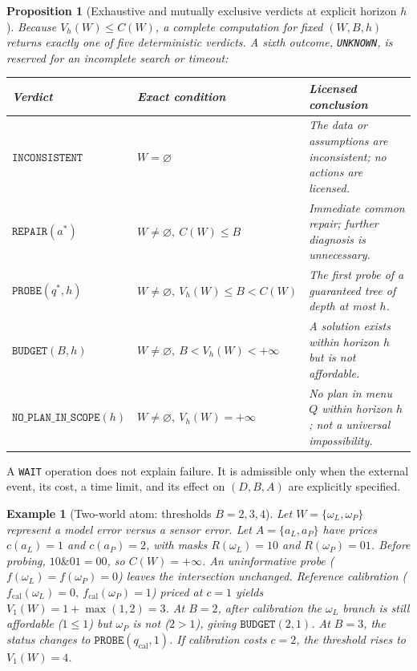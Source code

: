 \documentclass[11pt,a4paper]{article}
\theoremstyle{preprintthm}
\newtheorem{proposition}[theorem]{Proposition}
\theoremstyle{preprintdef}
\newtheorem{example}[theorem]{Example}
\begin{document}
\begin{proposition}[Exhaustive and mutually exclusive verdicts at explicit horizon $h$]
\label{prop:verdicts}
Because $V_h(W)\le C(W)$, a complete computation for fixed $(W,B,h)$ returns exactly one of five deterministic verdicts. A sixth outcome, \texttt{UNKNOWN}, is reserved for an incomplete search or timeout:
\begin{center}
\normalfont\footnotesize
\begin{tabularx}{\linewidth}{@{}l l >{\raggedright\arraybackslash}X@{}}
\toprule
\textbf{Verdict} & \textbf{Exact condition} & \textbf{Licensed conclusion} \\
\midrule
$\texttt{INCONSISTENT}$ & $W=\varnothing$ & The data or assumptions are inconsistent; no actions are licensed. \\
$\texttt{REPAIR}(a^*)$ & $W\ne\varnothing,\ C(W)\le B$ & Immediate common repair; further diagnosis is unnecessary. \\
$\texttt{PROBE}(q^*,h)$ & $W\ne\varnothing,\ V_h(W)\le B<C(W)$ & The first probe of a guaranteed tree of depth at most $h$. \\
$\texttt{BUDGET}(B,h)$ & $W\ne\varnothing,\ B<V_h(W)<+\infty$ & A solution exists within horizon $h$ but is not affordable. \\
$\texttt{NO\_PLAN\_IN\_SCOPE}(h)$ & $W\ne\varnothing,\ V_h(W)=+\infty$ & No plan in menu $Q$ within horizon $h$; not a universal impossibility. \\
\bottomrule
\end{tabularx}
\end{center}
\end{proposition}

A \texttt{WAIT} operation does not explain failure. It is admissible only when the external event, its cost, a time limit, and its effect on $(D,B,A)$ are explicitly specified.

\begin{example}[Two-world atom: thresholds $B=2,3,4$]
Let $W=\{\omega_L,\omega_P\}$ represent a model error versus a sensor error. Let $A=\{a_L,a_P\}$ have prices $c(a_L)=1$ and $c(a_P)=2$, with masks $R(\omega_L)=10$ and $R(\omega_P)=01$. Before probing, $10\mathbin{\&}01=00$, so $C(W)=+\infty$. An uninformative probe ($f(\omega_L)=f(\omega_P)=0$) leaves the intersection unchanged. Reference calibration ($f_{\mathrm{cal}}(\omega_L)=0,\ f_{\mathrm{cal}}(\omega_P)=1$) priced at $c=1$ yields $V_1(W)=1+\max(1,2)=3$. At $B=2$, after calibration the $\omega_L$ branch is still affordable ($1\le1$) but $\omega_P$ is not ($2>1$), giving $\texttt{BUDGET}(2,1)$. At $B=3$, the status changes to $\texttt{PROBE}(q_{\mathrm{cal}},1)$. If calibration costs $c=2$, the threshold rises to $V_1(W)=4$.
\end{example}
\end{document}
